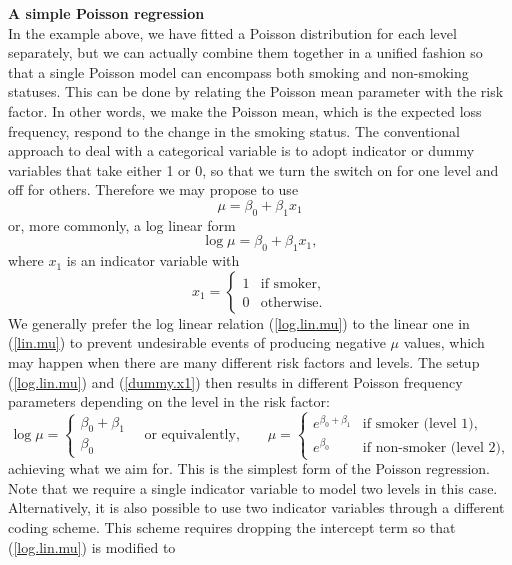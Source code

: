 \documentclass[12pt]{article}
\begin{document}
\noindent\textbf{A simple Poisson regression\\}
In the example above, we have fitted a Poisson distribution for each level separately, but we can actually combine them together in a unified fashion so that a single Poisson model can encompass both smoking and non-smoking statuses. This can be done by relating the Poisson mean parameter with the risk factor. In other words, we make the Poisson mean, which is the expected loss frequency, respond to the change in the smoking status. The conventional approach to deal with a categorical variable is to adopt indicator or dummy variables that take either 1 or 0, so that we turn the switch on for one level and off for others. Therefore we may propose to use 
\begin{equation}
\label{lin.mu}
\mu=\beta_0+\beta_1 x_1
\end{equation}
or, more commonly, a log linear form
\begin{equation}
\label{log.lin.mu}
\log \mu=\beta_0+\beta_1 x_1,
\end{equation}
where $x_1$ is an indicator variable with
\begin{equation}
\label{dummy.x1}x_1=
\begin{cases}
     1 & \text{if smoker}, \\
     0 & \text{otherwise}.
\end{cases}
\end{equation} 
We generally prefer the  log linear relation (\ref{log.lin.mu}) to the linear one in (\ref{lin.mu}) to prevent undesirable events of producing  negative $\mu$ values, which may happen when there are many different risk factors and levels. 
The setup (\ref{log.lin.mu}) and (\ref{dummy.x1}) then results in different Poisson frequency parameters depending on the level in the risk factor:
\begin{equation}
\label{ind.mu}\log \mu=
\begin{cases}
     \beta_0+\beta_1 \\
     \beta_0 
\end{cases}
\quad \text{or equivalently,}\qquad \mu= \begin{cases}
     e^{\beta_0+\beta_1} & \text{if smoker (level 1)}, \\
     e^{\beta_0} & \text{if non-smoker (level 2)},
\end{cases}
\end{equation} achieving what we aim for. This is the simplest form of the Poisson regression. 
Note that we require a single indicator variable to model two levels in this case. Alternatively, it is also possible to use two indicator variables through a different coding scheme. This scheme requires dropping the intercept term so that  (\ref{log.lin.mu}) is modified to
\end{document}
